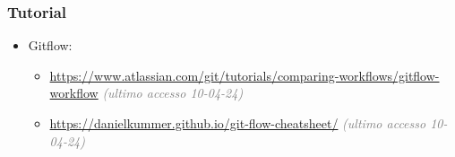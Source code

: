 \subsubsection{Tutorial}
\begin{itemize}
        \item Gitflow:
            \begin{itemize}
                \item \url{https://www.atlassian.com/git/tutorials/comparing-workflows/gitflow-workflow} \textcolor{gray}{\textit{(ultimo accesso 10-04-24)}}
                \item \url{https://danielkummer.github.io/git-flow-cheatsheet/} \textcolor{gray}{\textit{(ultimo accesso 10-04-24)}}
            \end{itemize}       
\end{itemize}